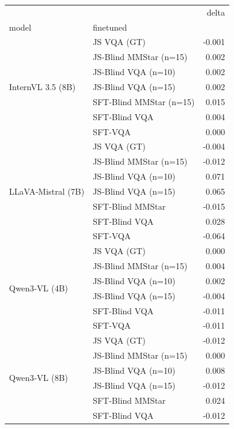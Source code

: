 \begin{tabular}{llr}
\toprule
 &  & delta \\
model & finetuned &  \\
\midrule
\multirow[t]{7}{*}{InternVL 3.5 (8B)} & JS VQA (GT) & -0.001 \\
 & JS-Blind MMStar (n=15) & 0.002 \\
 & JS-Blind VQA (n=10) & 0.002 \\
 & JS-Blind VQA (n=15) & 0.002 \\
 & SFT-Blind MMStar (n=15) & 0.015 \\
 & SFT-Blind VQA & 0.004 \\
 & SFT-VQA & 0.000 \\
\cline{1-3}
\multirow[t]{7}{*}{LLaVA‑Mistral (7B)} & JS VQA (GT) & -0.004 \\
 & JS-Blind MMStar (n=15) & -0.012 \\
 & JS-Blind VQA (n=10) & 0.071 \\
 & JS-Blind VQA (n=15) & 0.065 \\
 & SFT-Blind MMStar & -0.015 \\
 & SFT-Blind VQA & 0.028 \\
 & SFT-VQA & -0.064 \\
\cline{1-3}
\multirow[t]{6}{*}{Qwen3‑VL (4B)} & JS VQA (GT) & 0.000 \\
 & JS-Blind MMStar (n=15) & 0.004 \\
 & JS-Blind VQA (n=10) & 0.002 \\
 & JS-Blind VQA (n=15) & -0.004 \\
 & SFT-Blind VQA & -0.011 \\
 & SFT-VQA & -0.011 \\
\cline{1-3}
\multirow[t]{6}{*}{Qwen3‑VL (8B)} & JS VQA (GT) & -0.012 \\
 & JS-Blind MMStar (n=15) & 0.000 \\
 & JS-Blind VQA (n=10) & 0.008 \\
 & JS-Blind VQA (n=15) & -0.012 \\
 & SFT-Blind MMStar & 0.024 \\
 & SFT-Blind VQA & -0.012 \\
\cline{1-3}
\bottomrule
\end{tabular}
